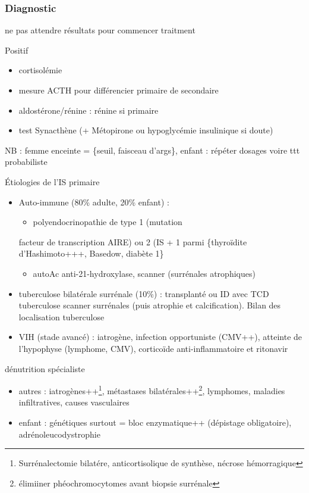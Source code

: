\documentclass[11pt]{article}
\begin{document}
\subsubsection{Diagnostic}
\label{sec:orgbbeb407}
\danger ne pas attendre résultats pour commencer traitment \skull

Positif 
\begin{itemize}
\item cortisolémie
\item mesure ACTH pour différencier primaire de secondaire
\item aldostérone/rénine : rénine \inc si primaire
\item test Synacthène (+ Métopirone ou hypoglycémie insulinique si doute)
\end{itemize}

NB : femme enceinte = \{\inc seuil, faisceau d'args\}, enfant : répéter dosages
voire ttt probabiliste

Étiologies de l'IS primaire
\begin{itemize}
\item Auto-immune (80\% adulte, 20\% enfant) : 
\begin{itemize}
\item polyendocrinopathie de type 1 (mutation
\end{itemize}
facteur de transcription AIRE) ou 2 (IS + 1 parmi \{thyroïdite d'Hashimoto+++,
Basedow, diabète 1\}
\begin{itemize}
\item \thus autoAc anti-21-hydroxylase, scanner (surrénales atrophiques)
\end{itemize}
\item tuberculose bilatérale surrénale (10\%) : transplanté ou ID avec TCD tuberculose
\thus scanner surrénales (\inc puis atrophie et calcification). Bilan des
localisation tuberculose
\item VIH (stade avancé) : iatrogène, infection opportuniste (CMV++), atteinte de
l'hypophyse (lymphome, CMV), corticoïde anti-inflammatoire et ritonavir
\end{itemize}
\danger dénutrition \thus spécialiste
\begin{itemize}
\item autres : iatrogènes++\footnote{Surrénalectomie bilatére, anticortisolique de synthèse, nécrose hémorragique}, métastases bilatérales++\footnote{\danger élimiiner phéochromocytomes avant biopsie surrénale}, lymphomes, maladies
infiltratives, causes vasculaires
\item enfant : génétiques surtout = bloc enzymatique++ (dépistage obligatoire), adrénoleucodystrophie
\end{itemize}
\end{document}
